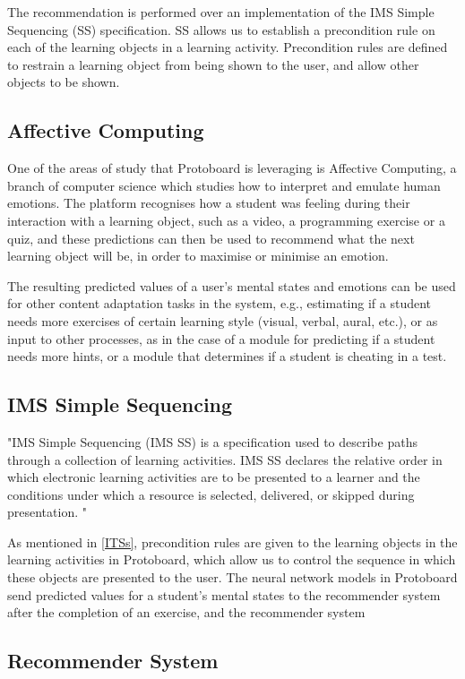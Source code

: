 \documentclass{acm_proc_article-sp}
\begin{document}
The recommendation is performed over an implementation of the IMS Simple
Sequencing (SS) specification. SS allows us to establish a precondition
rule on each of the learning objects in a learning
activity. Precondition rules are defined to restrain a learning object
from being shown to the user, and allow other objects to be shown.


\subsection{Affective Computing}
One of the areas of study that Protoboard is leveraging is Affective
Computing, a branch of computer science which studies how to interpret
and emulate human emotions. The platform recognises how a student was
feeling during their interaction with a learning object, such as a
video, a programming exercise or a quiz, and these predictions can
then be used to recommend what the next learning object will be, in
order to maximise or minimise an emotion.

The resulting predicted values of a user's mental states and emotions
can be used for other content adaptation tasks in the system, e.g.,
estimating if a student needs more exercises of certain learning style
(visual, verbal, aural, etc.), or as input to other processes, as in
the case of a module for predicting if a student needs more hints, or
a module that determines if a student is cheating in a test.


\subsection{IMS Simple Sequencing}

"IMS Simple Sequencing (IMS SS) is a specification used to describe
paths through a collection of learning activities. IMS SS declares
the relative order in which electronic learning activities are to be
presented to a learner and the conditions under which a resource is
selected, delivered, or skipped during
presentation. \cite{bailey2007ims}"

As mentioned in \ref{ITSs}, precondition rules are given to the
learning objects in the learning activities in Protoboard, which allow
us to control the sequence in which these objects are presented to the
user. The neural network models in Protoboard send predicted values
for a student's mental states to the recommender system after the
completion of an exercise, and the recommender system 


\subsection{Recommender System}




\balancecolumns
\end{document}
